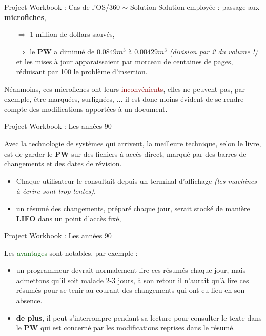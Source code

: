 \documentclass{beamer}
\newcommand{\gre}[1]{\textcolor{darkgreen}{#1}}
\newcommand{\red}[1]{\textcolor{darkred}{#1}}
\begin{document}
\begin{frame}{Project Workbook : Cas de l'OS/360 $\sim$ Solution}
Solution employée : passage aux \textbf{microfiches}, 
\begin{itemize}
\item[$\Rightarrow$] 1 million de dollars sauvés,
\item[$\Rightarrow$] le \textbf{PW} a diminué de $0.0849 m^3$ à $0.00429 m^3$ \textit{(division par 2 du volume !)} et les 
mises à jour apparaissaient par morceau de centaines de pages, réduisant par 100 le problème d'insertion.\\
\end{itemize}
Néanmoins, ces microfiches ont leurs \red{inconvénients}, elles ne peuvent pas, par exemple, être marquées, surlignées, ... il est 
donc moins évident de se rendre compte des modifications apportées à un document. \\

\end{frame}

\begin{frame}{Project Workbook : Les années 90}

Avec la technologie de systèmes qui arrivent, la meilleure technique, selon le livre, est de garder le \textbf{PW} sur des 
fichiers à accès direct, marqué par des barres de changements et des dates de révision. 
\begin{itemize}
\item Chaque utilisateur le consultait depuis un terminal d'affichage \textit{(les machines à écrire sont trop lentes)},
\item un résumé des changements, préparé chaque jour, serait stocké de manière \textbf{LIFO} dans un point d'accès fixé,
\end{itemize}

\end{frame}

\begin{frame}{Project Workbook : Les années 90}

Les \gre{avantages} sont notables, par exemple :
\begin{itemize}
\item un programmeur devrait normalement lire ces résumés chaque jour, mais admettons 
qu'il soit malade 2-3 jours, à son retour il n'aurait qu'à lire ces résumés pour se tenir au courant des changements qui ont eu 
lieu en son absence.
\item \textbf{de plus}, il peut s'interrompre pendant sa lecture pour consulter le texte dans le \textbf{PW} qui 
est concerné par les modifications reprises dans le résumé.
\end{itemize}

\end{frame}
\end{document}

